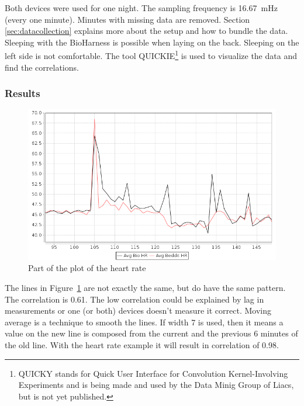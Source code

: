 			Both devices were used for one night. The sampling frequency is \SI{16.67}{\milli\hertz} (every one minute). Minutes with missing data are removed. Section \ref{sec:datacollection} explains more about the setup and how to bundle the data. Sleeping with the BioHarness is possible when laying on the back. Sleeping on the left side is not comfortable. The tool QUICKIE\footnote{QUICKY stands for Quick User Interface for Convolution Kernel-Involving Experiments and is being made and used by the Data Minig Group of Liacs, but is not yet published.} is used to visualize the data and find the correlations.

		\subsubsection{Results}
			
			\begin{figure}[h]
				\centering
					\includegraphics[scale=0.5]{avgbiovsavgbeddit.png}
					
				\caption{Part of the plot of the heart rate}
				\label{fig:avgbiovsavgbeddit}

			\end{figure}

			The lines in Figure~\ref{fig:avgbiovsavgbeddit} are not exactly the same, but do have the same pattern. The correlation is 0.61. The low correlation could be explained by lag in measurements or one (or both) devices doesn't measure it correct. Moving average is a technique to smooth the lines. If width 7 is used, then it means a value on the new line is composed from the current and the previous 6 minutes of the old line. With the heart rate example it will result in correlation of 0.98.\
						
